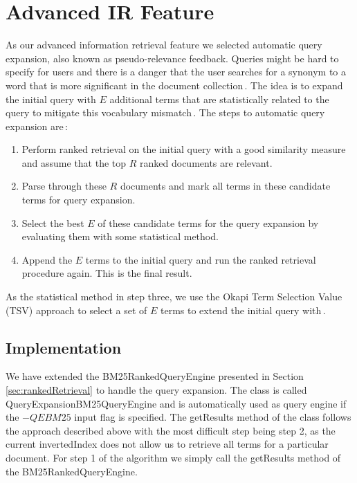 
\section{Advanced IR Feature}
\label{sec:advancedIRFeature}
As our advanced information retrieval feature we selected automatic query expansion, also known as pseudo-relevance feedback. Queries might be hard to specify for users and there is a danger that the user searches for a synonym to a word that is more significant in the document collection\,\cite{billerbeckzobel04}. The idea is to expand the initial query with $E$ additional terms that are statistically related to the query to mitigate this vocabulary mismatch\,\cite{billerbeckzobel04}. The steps to automatic query expansion are\,\cite{scholer13}: 

\begin{enumerate}
	\item Perform ranked retrieval on the initial query with a good similarity measure and assume that the top $R$ ranked documents are relevant.
	\item Parse through these $R$ documents and mark all terms in these candidate terms for query expansion.
	\item Select the best $E$ of these candidate terms for the query expansion by evaluating them with some statistical method.
	\item Append the $E$ terms to the initial query and run the ranked retrieval procedure again. This is the final result.
\end{enumerate}

As the statistical method in step three, we use the Okapi Term Selection Value (TSV) approach to select a set of $E$ terms to extend the initial query with\,\cite{billerbeckzobel04}.

\subsection*{Implementation}
We have extended the BM25RankedQueryEngine presented in Section \ref{sec:rankedRetrieval} to handle the query expansion. The class is called QueryExpansionBM25QueryEngine and is automatically used as query engine if the $-QEBM25$ input flag is specified. The getResults method of the class follows the approach described above with the most difficult step being step 2, as the current invertedIndex does not allow us to retrieve all terms for a particular document. For step 1 of the algorithm we simply call the getResults method of the BM25RankedQueryEngine.

